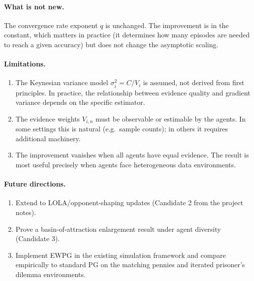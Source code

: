 \documentclass[11pt,a4paper]{article}
\begin{document}
\paragraph{What is not new.} The convergence rate exponent $q$ is unchanged. The improvement is in the constant, which matters in practice (it determines how many episodes are needed to reach a given accuracy) but does not change the asymptotic scaling.

\paragraph{Limitations.}
\begin{enumerate}
    \item The Keynesian variance model $\sigma_i^2 = C/V_i$ is assumed, not derived from first principles. In practice, the relationship between evidence quality and gradient variance depends on the specific estimator.
    \item The evidence weights $V_{i,n}$ must be observable or estimable by the agents. In some settings this is natural (e.g.\ sample counts); in others it requires additional machinery.
    \item The improvement vanishes when all agents have equal evidence. The result is most useful precisely when agents face heterogeneous data environments.
\end{enumerate}

\paragraph{Future directions.}
\begin{enumerate}
    \item Extend to LOLA/opponent-shaping updates (Candidate 2 from the project notes).
    \item Prove a basin-of-attraction enlargement result under agent diversity (Candidate 3).
    \item Implement EWPG in the existing simulation framework and compare empirically to standard PG on the matching pennies and iterated prisoner's dilemma environments.
\end{enumerate}
\end{document}
